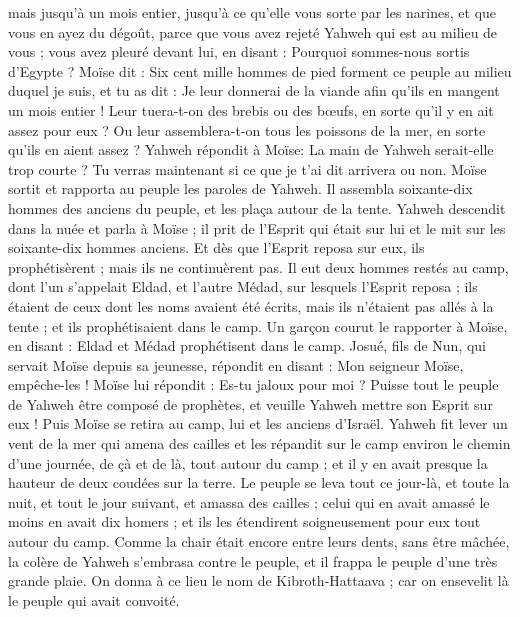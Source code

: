 \begin{multicols}{2}
mais jusqu'à un mois entier, jusqu'à ce qu'elle vous sorte par les narines, et que vous en ayez du dégoût, parce que vous avez rejeté Yahweh qui est au milieu de vous ; vous avez pleuré devant lui, en disant : Pourquoi sommes-nous sortis d'Egypte ?
Moïse dit : Six cent mille hommes de pied forment ce peuple au milieu duquel je suis, et tu as dit : Je leur donnerai de la viande afin qu'ils en mangent un mois entier !
Leur tuera-t-on des brebis ou des bœufs, en sorte qu'il y en ait assez pour eux ? Ou leur assemblera-t-on tous les poissons de la mer, en sorte qu'ils en aient assez ?
Yahweh répondit à Moïse: La main de Yahweh serait-elle trop courte ? Tu verras maintenant si ce que je t'ai dit arrivera ou non.
Moïse sortit et rapporta au peuple les paroles de Yahweh. Il assembla soixante-dix hommes des anciens du peuple, et les plaça autour de la tente.
Yahweh descendit dans la nuée et parla à Moïse ; il prit de l'Esprit qui était sur lui et le mit sur les soixante-dix hommes anciens. Et dès que l'Esprit reposa sur eux, ils prophétisèrent ; mais ils ne continuèrent pas.
Il eut deux hommes restés au camp, dont l'un s'appelait Eldad, et l'autre Médad, sur lesquels l'Esprit reposa ; ils étaient de ceux dont les noms avaient été écrits, mais ils n'étaient pas allés à la tente ; et ils prophétisaient dans le camp.
Un garçon courut le rapporter à Moïse, en disant : Eldad et Médad prophétisent dans le camp.
Josué, fils de Nun, qui servait Moïse depuis sa jeunesse, répondit en disant : Mon seigneur Moïse, empêche-les !
Moïse lui répondit : Es-tu jaloux pour moi ? Puisse tout le peuple de Yahweh être composé de prophètes, et veuille Yahweh mettre son Esprit sur eux !
Puis Moïse se retira au camp, lui et les anciens d'Israël.
Yahweh fit lever un vent de la mer qui amena des cailles et les répandit sur le camp environ le chemin d'une journée, de çà et de là, tout autour du camp ; et il y en avait presque la hauteur de deux coudées sur la terre.
Le peuple se leva tout ce jour-là, et toute la nuit, et tout le jour suivant, et amassa des cailles ; celui qui en avait amassé le moins en avait dix homers ; et ils les étendirent soigneusement pour eux tout autour du camp.
Comme la chair était encore entre leurs dents, sans être mâchée, la colère de Yahweh s'embrasa contre le peuple, et il frappa le peuple d'une très grande plaie.
On donna à ce lieu le nom de Kibroth-Hattaava ; car on ensevelit là le peuple qui avait convoité.

\end{multicols}
